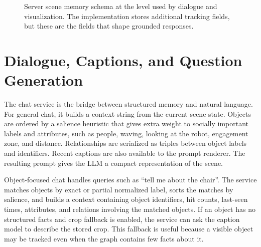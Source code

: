 \begin{figure}[t]
\centering
{}
\caption{Server scene memory schema at the level used by dialogue and visualization. The implementation stores additional tracking fields, but these are the fields that shape grounded responses.}
\label{fig:server-memory-schema}
\end{figure}

\section{Dialogue, Captions, and Question Generation}\label{sec:server-dialogue-services}

The chat service is the bridge between structured memory and natural language. For general chat, it builds a context string from the current scene state. Objects are ordered by a salience heuristic that gives extra weight to socially important labels and attributes, such as people, waving, looking at the robot, engagement zone, and distance. Relationships are serialized as triples between object labels and identifiers. Recent captions are also available to the prompt renderer. The resulting prompt gives the LLM a compact representation of the scene.

Object-focused chat handles queries such as ``tell me about the chair''. The service matches objects by exact or partial normalized label, sorts the matches by salience, and builds a context containing object identifiers, hit counts, last-seen times, attributes, and relations involving the matched objects. If an object has no structured facts and crop fallback is enabled, the service can ask the caption model to describe the stored crop. This fallback is useful because a visible object may be tracked even when the graph contains few facts about it.

